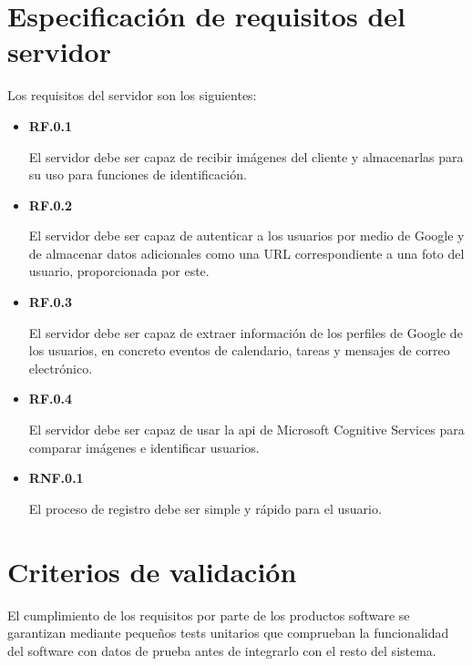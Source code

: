 \section{Especificación de requisitos del servidor}

Los requisitos del servidor son los siguientes:

\begin{itemize}
	\item \textbf{RF.0.1}

	El servidor debe ser capaz de recibir imágenes del cliente y almacenarlas para su uso para funciones de identificación.

	\item \textbf{RF.0.2}

	El servidor debe ser capaz de autenticar a los usuarios por medio de Google y de almacenar datos adicionales como una URL correspondiente a una foto del usuario, proporcionada por este.

	\item \textbf{RF.0.3}

	El servidor debe ser capaz de extraer información de los perfiles de Google de los usuarios, en concreto eventos de calendario, tareas y mensajes de correo electrónico.

	\item \textbf{RF.0.4}

	El servidor debe ser capaz de usar la \acrshort{api} de Microsoft Cognitive Services para comparar imágenes e identificar usuarios.

	\item \textbf{RNF.0.1}
	
	El proceso de registro debe ser simple y rápido para el usuario.
	
\end{itemize}

\section{Criterios de validación}

El cumplimiento de los requisitos por parte de los productos software se garantizan mediante pequeños tests unitarios que comprueban la funcionalidad del software con datos de prueba antes de integrarlo con el resto del sistema.
